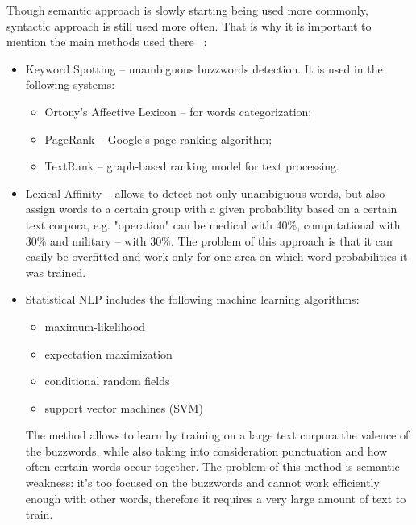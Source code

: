 Though semantic approach is slowly starting being used more commonly, syntactic approach is still used more often. That is why it is important to mention the main methods used there ~\cite{Cambria}:

\begin{itemize}
\item Keyword Spotting -- unambiguous buzzwords detection. It is used in the following systems:
\begin{itemize}
\item Ortony's Affective Lexicon -- for words categorization;
\item PageRank -- Google's page ranking algorithm;
\item TextRank -- graph-based ranking model for text processing.
\end{itemize}  
\item Lexical Affinity -- allows to detect not only unambiguous words, but also assign words to a certain group with a given probability based on a certain text corpora, e.g. "operation" can be medical with 40\%, computational with 30\% and military -- with 30\%. The problem of this approach is that it can easily be overfitted and work only for one area on which word probabilities it was trained.
\item Statistical NLP includes the following machine learning algorithms:
\begin{itemize}
\item maximum-likelihood
\item expectation maximization
\item conditional random fields
\item support vector machines (SVM)
\end{itemize}
The method allows to learn by training on a large text corpora the valence of the buzzwords, while also taking into consideration punctuation and how often certain words occur together. The problem of this method is semantic weakness: it's too focused on the buzzwords and cannot work efficiently enough with other words, therefore it requires a very large amount of text to train.
\end{itemize}

